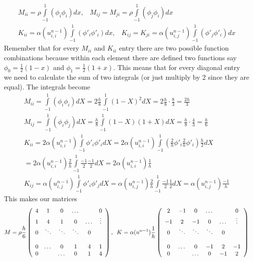 \documentclass[a4paper,english, 10pt, twoside]{article}
\begin{document}
\begin{align*}
M_{ii} =   \rho\int\limits_{-1}^1(\phi_i\phi_i)dx, \;\;\;
M_{ij} = M_{ji} =  \rho\int\limits_{-1}^1(\phi_j\phi_i)dx \\
K_{ii} =  \alpha(u^{n-1}_{i,i})\int\limits_{-1}^1(\phi'_i\phi'_i)dx, \;\;\;
K_{ij} = K_{ji} = \alpha(u^{n-1}_{i,j})\int\limits_{-1}^1(\phi'_j\phi'_i)dx
\end{align*}
Remember that for every $M_{ii}$ and $K_{ii}$ entry there are two possible function combinations because within each element there 
are defined two functions say $\phi_0 = \frac{1}{2}(1-x)$ and $\phi_1 = \frac{1}{2}(1+x)$. This means that for every diagonal entry 
we need to calculate the sum of two integrals (or just multiply by 2 since they are equal). The integrals become
\begin{align*}
M_{ii} = \int\limits_{-1}^1(\phi_i\phi_i)dX = 2\frac{h}{8}\int\limits_{-1}^1(1-X)^2dX = 2\frac{h}{8}\cdot\frac{8}{3} = \frac{2h}{3}\\
M_{ij} = \int\limits_{-1}^1(\phi_i\phi_j)dX = \frac{h}{8}\int\limits_{-1}^1(1-X)(1+X)dX = \frac{h}{8}\cdot\frac{4}{3} = \frac{h}{6}\\
K_{ii} = 2\alpha(u^{n-1}_{i,i})\int\limits_{-1}^1\phi'_i\phi'_idX = 2\alpha(u^{n-1}_{i,i})\int\limits_{-1}^1(\frac{2}{h}\phi'_i\frac{2}{h}\phi'_i)\frac{h}{2}dX
 \\= 2\alpha(u^{n-1}_{i,i})\frac{2}{h}\int\limits_{-1}^1\frac{-1}{2}\frac{-1}{2}dX = 2\alpha(u^{n-1}_{i,i})\frac{1}{h}\\
K_{ij} = \alpha(u^{n-1}_{i,j})\int\limits_{-1}^1\phi'_i\phi'_jdX = \alpha(u^{n-1}_{i,j})\frac{2}{h}\int\limits_{-1}^1\frac{-1}{2}\frac{1}{2}dX = 
\alpha(u^{n-1}_{i,j})\frac{-1}{h}
\end{align*}
This makes our matrices
\begin{equation}\label{matrices}
 M = \rho\frac{h}{6}\left(\begin{array}{c c c c c c}
    4 & 1 & 0 & \dots & & 0 \\
    1 & 4 & 1 & 0 &\dots & \vdots \\
    0 & \ddots & \ddots & \ddots & 0& \\
     & & & & & \\
     0 & \dots & 0 & 1 & 4 & 1\\
     0 & & \dots & 0 & 1 & 4
 \end{array}\right), \:\;
 K = \alpha(u^{n-1})\frac{1}{h}\left(\begin{array}{c c c c c c}
          2 & -1 & 0 & \dots & & 0 \\
	  -1 & 2 & -1 & 0 &\dots & \vdots \\
	  0 & \ddots & \ddots & \ddots & 0& \\
	  & & & & & \\
	  0 & \dots & 0 & -1 & 2 & -1\\
	  0 & & \dots & 0 & -1 & 2
                      \end{array}\right)
\end{equation}
\end{document}
